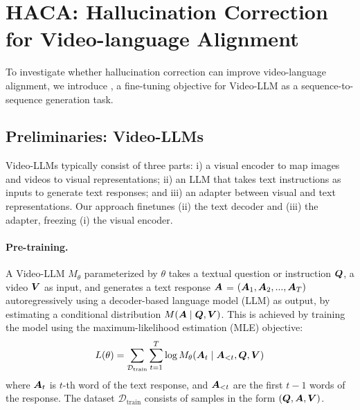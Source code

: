 

\section{HACA: Hallucination Correction for Video-language Alignment}
To investigate whether hallucination correction can improve video-language alignment, we introduce \method{}, 
a fine-tuning objective for Video-LLM
as a sequence-to-sequence generation task.

\subsection{Preliminaries: Video-LLMs}
\label{sec:prelim}

Video-LLMs typically consist of three parts: i) a visual encoder to map images and videos to visual representations; ii)
an LLM that takes text instructions as inputs to generate text responses; and iii) an adapter between visual and text representations. Our approach finetunes (ii) the text decoder and (iii) the adapter, freezing (i) the visual encoder.


\paragraph{Pre-training.}
A Video-LLM $M_\theta$ parameterized by $\theta$ takes a textual question or instruction $\boldsymbol{Q}$, a video $\boldsymbol{V}$ as input, and generates a text response $\boldsymbol{A}$ = $(\boldsymbol{A}_1, \boldsymbol{A}_2, ..., \boldsymbol{A}_T)$ autoregressively using a decoder-based language model (LLM) as output, by estimating a conditional distribution  $M(\boldsymbol{A} \mid \boldsymbol{Q}, \boldsymbol{V})$.
This is achieved by training the model using the maximum-likelihood estimation (MLE) objective:
\begin{equation}
 L(\theta) = \sum_{\mathcal{D}_{\textrm{train}}}  \sum_{t=1}^{T} \log M_{\theta} (\boldsymbol{A}_t \mid \boldsymbol{A}_{<t}, \boldsymbol{Q}, \boldsymbol{V})
 \label{equation:videollm_training}
\end{equation}
where $\boldsymbol{A}_t$ is $t$-th word of the text response, and $\boldsymbol{A}_{<t}$ are the first $t - 1$ words of the response.
The dataset $\mathcal{D}_{\textrm{train}}$ consists of samples in the form $(\boldsymbol{Q}, \boldsymbol{A}, \boldsymbol{V})$.


